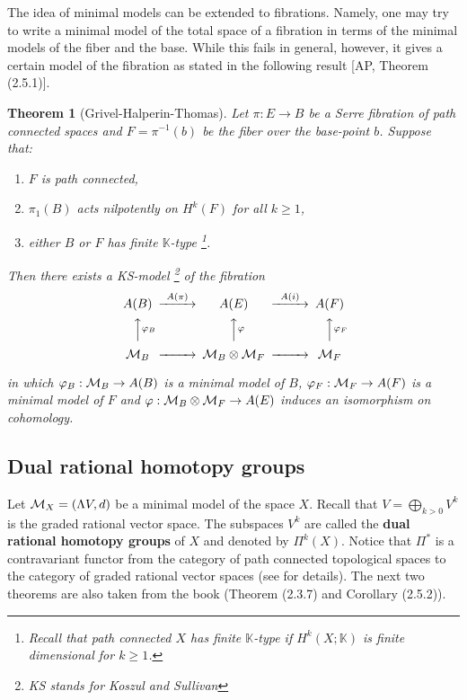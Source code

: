 \documentclass[a4paper,14pt]{article}
\newcommand{\B}[1]{\mathbb #1}
\newcommand{\C}[1]{{\cal #1}}
\newcommand{\La}{{\Lambda}}
\newcommand{\qed}{\rightline {$\Box $}}
\newcommand{\BS}{{\bigskip}}
\newtheorem{thm}[theorem]{Theorem}
\numberwithin{equation}{section}
\numberwithin{figure}{section}
\begin{document}
The idea of minimal models can be extended to  fibrations.
Namely, one may try to write a minimal model of the total space
of a fibration in terms of the minimal models of the fiber and the
base. While this fails in general, however, it gives a certain model
of the fibration as stated in the following result [AP, Theorem (2.5.1)].




\begin{thm} [Grivel-Halperin-Thomas] \label{T:fght}
         Let $\pi :E\to B$ be a Serre fibration of path connected spaces
         and $F = \pi ^{-1}(b)$ be the fiber over the base-point $b$.
         Suppose that:


       \begin{enumerate}
           \item $F$ is path connected,
           \item $\pi _1(B)$
           acts nilpotently on $H^k(F)$ for all $k\geq 1$,
           \item either $B$ or $F$ has finite $\B K$-type
\footnote{
          Recall that path connected $X$ has finite $\B K$-type if
          $H^k(X;\B K)$ is finite dimensional for  $k\geq 1$.}.
          \end{enumerate}

        \noindent
        Then there exists a KS-model
        \footnote{KS stands for Koszul and Sullivan}
        of the fibration
        \bigskip
$$ 
\CD
           A(B) @>A(\pi )>>   A(E)   @>A(i)>>    A(F) \\
            @AA\varphi _BA          @AA\varphi A       @AA\varphi _F A \\
       {\C M}_B @>>> \C M_B\otimes \C M_F @>>>    \C M_F
\endCD
$$


      \bigskip
      \noindent
      in which $\varphi _B:\C M_B \to A(B)$ is a minimal model of $B$,
      $\varphi _F :\C M_F\to A(F)$ is a minimal model of $F$ and
       $\varphi:\C M_B\otimes \C M_F\to A(E)$ induces an isomorphism
on cohomology.
  \end{thm}

\qed



\BS
\noindent
\subsection{Dual rational homotopy groups}\label{SS:drh}


Let $\C M_X = (\La V, d)$ be a minimal model of the space
$X$. Recall that $V = \bigoplus _{k>0} V^k $ is the graded rational
vector space. The subspaces $V^k$ are called the {\bf dual
rational homotopy groups} of $X$ and denoted by $\Pi ^k(X)$.
Notice that $\Pi ^*$ is a contravariant functor from
the category of path connected topological spaces to the
category of graded rational vector spaces (see \cite{ap}
for details). The next two theorems are also taken from the book
\cite{ap} (Theorem (2.3.7) and Corollary (2.5.2)).
\end{document}

